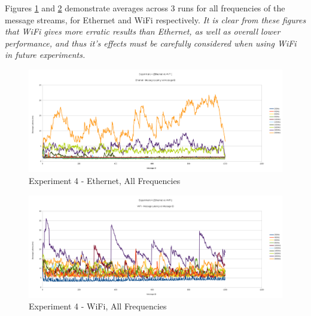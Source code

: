 \documentclass[../dissertation.tex]{subfiles}
\begin{document}
Figures \ref{exp4-ethernet-all-freq} and \ref{exp4-wifi-all-freq} demonstrate averages across 3 runs for all frequencies of the message streams, for Ethernet and WiFi respectively. \textit{It is clear from these figures that WiFi gives more erratic results than Ethernet, as well as overall lower performance, and thus it's effects must be carefully considered when using WiFi in future experiments.}

\begin{figure}[H]
\centering
\includegraphics[width=\textwidth]{images/experiment4/ethernet_mean_times_pretty.png}
\caption{Experiment 4 - Ethernet, All Frequencies}
\label{exp4-ethernet-all-freq}
\end{figure}

\begin{figure}[H]
\centering
\includegraphics[width=\textwidth]{images/experiment4/wifi_mean_times_pretty.png}
\caption{Experiment 4 - WiFi, All Frequencies}
\label{exp4-wifi-all-freq}
\end{figure}
\end{document}
